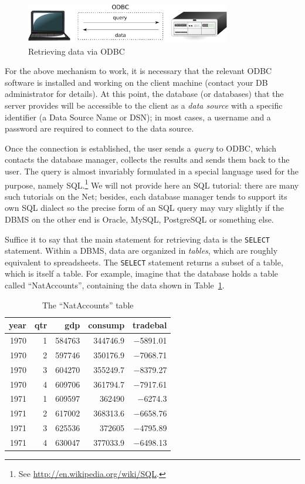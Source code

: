 \begin{figure}[htbp]
  \centering
  \includegraphics[width=0.8\textwidth]{figures/odbc}
  \caption{Retrieving data via ODBC}
  \label{fig:odbc}
\end{figure}

For the above mechanism to work, it is necessary that the relevant
ODBC software is installed and working on the client machine (contact
your DB administrator for details). At this point, the database (or
databases) that the server provides will be accessible to the client
as a \emph{data source} with a specific identifier (a Data Source Name
or DSN); in most cases, a username and a password are required to
connect to the data source.

Once the connection is established, the user sends a \emph{query} to
ODBC, which contacts the database manager, collects the results and
sends them back to the user. The query is almost invariably formulated
in a special language used for the purpose, namely SQL.\footnote{See
  \url{http://en.wikipedia.org/wiki/SQL}.} We will not provide here an
SQL tutorial: there are many such tutorials on the Net; besides, each
database manager tends to support its own SQL dialect so the precise
form of an SQL query may vary slightly if the DBMS on the other end is
Oracle, MySQL, PostgreSQL or something else.

Suffice it to say that the main statement for retrieving data is the
\texttt{SELECT} statement.  Within a DBMS, data are organized in
\emph{tables}, which are roughly equivalent to spreadsheets. The
\texttt{SELECT} statement returns a subset of a table, which is itself
a table. For example, imagine that the database holds a table called
``NatAccounts'', containing the data shown in
Table~\ref{tab:odbc-nataccounts}.

\begin{table}[htbp]
  \centering
  \begin{tabular}{rrrrr}
    \hline
    year	& qtr	& gdp	 & consump	& tradebal \\ 
    \hline
    1970	& 1	& 584763 & 344746.9	& $-$5891.01 \\ 
    1970	& 2	& 597746 & 350176.9	& $-$7068.71 \\ 
    1970	& 3	& 604270 & 355249.7	& $-$8379.27 \\ 
    1970	& 4	& 609706 & 361794.7	& $-$7917.61 \\ 
    1971	& 1	& 609597 & 362490	& $-$6274.3  \\ 
    1971	& 2	& 617002 & 368313.6	& $-$6658.76 \\ 
    1971	& 3	& 625536 & 372605	& $-$4795.89 \\ 
    1971	& 4	& 630047 & 377033.9	& $-$6498.13  
  \end{tabular}
  \caption{The ``NatAccounts'' table}
  \label{tab:odbc-nataccounts}
\end{table}

